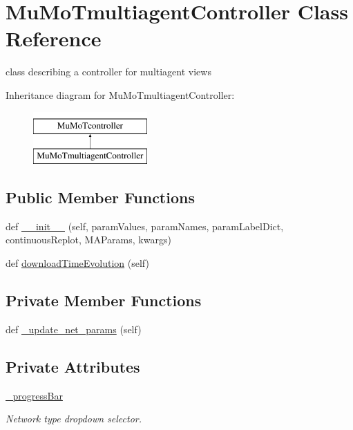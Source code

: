 \hypertarget{class_mu_mo_t_1_1_mu_mo_t_1_1_mu_mo_tmultiagent_controller}{}\section{Mu\+Mo\+Tmultiagent\+Controller Class Reference}
\label{class_mu_mo_t_1_1_mu_mo_t_1_1_mu_mo_tmultiagent_controller}


class describing a controller for multiagent views  


Inheritance diagram for Mu\+Mo\+Tmultiagent\+Controller\+:\begin{figure}[H]
\begin{center}
\leavevmode
\includegraphics[height=2.000000cm]{class_mu_mo_t_1_1_mu_mo_t_1_1_mu_mo_tmultiagent_controller}
\end{center}
\end{figure}
\subsection*{Public Member Functions}
\begin{DoxyCompactItemize}
\item 
def \hyperlink{class_mu_mo_t_1_1_mu_mo_t_1_1_mu_mo_tmultiagent_controller_a819b06d2efbd452268cf86921dee8a43}{\+\_\+\+\_\+init\+\_\+\+\_\+} (self, param\+Values, param\+Names, param\+Label\+Dict, continuous\+Replot, M\+A\+Params, kwargs)
\item 
def \hyperlink{class_mu_mo_t_1_1_mu_mo_t_1_1_mu_mo_tmultiagent_controller_afa43c0f74ab5a6630a4b7ab0af8ed990}{download\+Time\+Evolution} (self)
\end{DoxyCompactItemize}
\subsection*{Private Member Functions}
\begin{DoxyCompactItemize}
\item 
def \hyperlink{class_mu_mo_t_1_1_mu_mo_t_1_1_mu_mo_tmultiagent_controller_a05f01fc433f3ff6861ec56d6663cb84e}{\+\_\+update\+\_\+net\+\_\+params} (self)
\end{DoxyCompactItemize}
\subsection*{Private Attributes}
\begin{DoxyCompactItemize}
\item 
\hyperlink{class_mu_mo_t_1_1_mu_mo_t_1_1_mu_mo_tmultiagent_controller_a018864aa22d2adb0d3958fb0adbce8e2}{\+\_\+progress\+Bar}
\begin{DoxyCompactList}\small\item\em Network type dropdown selector. \end{DoxyCompactList}\end{DoxyCompactItemize}


